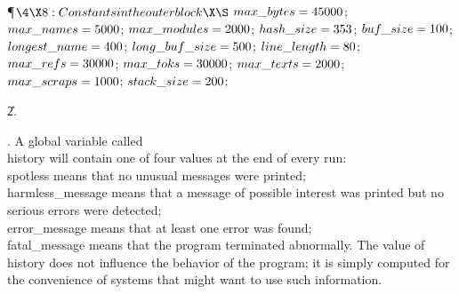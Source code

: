 \Y\P$\4\X8:Constants in the outer block\X\S$\6
$\\{max\_bytes}=45000$;\6
$\\{max\_names}=5000$;\6
$\\{max\_modules}=2000$;\6
$\\{hash\_size}=353$;\6
$\\{buf\_size}=100$;\6
$\\{longest\_name}=400$;\6
$\\{long\_buf\_size}=500$;\6
$\\{line\_length}=80$;\6
$\\{max\_refs}=30000$;\6
$\\{max\_toks}=30000$;\6
$\\{max\_texts}=2000$;\6
$\\{max\_scraps}=1000$;\6
$\\{stack\_size}=200$;\par
\U2\*.\fi

. A global variable called \\{history} will contain one of four values
at the end of every run: \\{spotless} means that no unusual messages were
printed; \\{harmless\_message} means that a message of possible interest
was printed but no serious errors were detected; \\{error\_message} means that
at least one error was found; \\{fatal\_message} means that the program
terminated abnormally. The value of \\{history} does not influence the
behavior of the program; it is simply computed for the convenience
of systems that might want to use such information.

